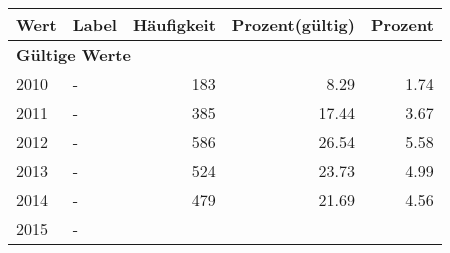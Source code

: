      \begin{longtable}{lXrrr}
     \toprule
     \textbf{Wert} & \textbf{Label} & \textbf{Häufigkeit} & \textbf{Prozent(gültig)} & \textbf{Prozent} \\
     \endhead
     \midrule
     \multicolumn{5}{l}{\textbf{Gültige Werte}}\\

     2010 &
     \multicolumn{1}{X}{ -  } &


       \num{183} &
       \num[round-mode=places,round-precision=2]{8,29} &
         \num[round-mode=places,round-precision=2]{1,74} \\

     2011 &
     \multicolumn{1}{X}{ -  } &


       \num{385} &
       \num[round-mode=places,round-precision=2]{17,44} &
         \num[round-mode=places,round-precision=2]{3,67} \\

     2012 &
     \multicolumn{1}{X}{ -  } &


       \num{586} &
       \num[round-mode=places,round-precision=2]{26,54} &
         \num[round-mode=places,round-precision=2]{5,58} \\

     2013 &
     \multicolumn{1}{X}{ -  } &


       \num{524} &
       \num[round-mode=places,round-precision=2]{23,73} &
         \num[round-mode=places,round-precision=2]{4,99} \\

     2014 &
     \multicolumn{1}{X}{ -  } &


       \num{479} &
       \num[round-mode=places,round-precision=2]{21,69} &
         \num[round-mode=places,round-precision=2]{4,56} \\

     2015 &
     \multicolumn{1}{X}{ -  } &



\end{longtable}
